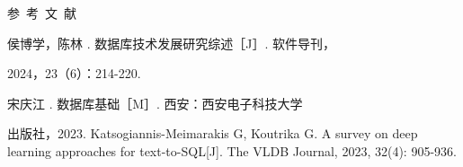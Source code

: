 \documentclass[10.5pt,compsoc,twocolumn]{CjC} %
\theoremstyle{mystyle}
\begin{document}
    
{
\begin{CJK*}{UTF8}{zhhei}参~考~文~献\end{CJK*}}
\begin{thebibliography}{99}
 \addtolength{\itemsep}{-1em}
\vspace {1.5mm}

\begin{CJK*}{UTF8}{song}侯博学，陈林 . 数据库技术发展研究综述［J］. 软件导刊，\end{CJK*}
2024，23（6）：214-220.
 \begin{CJK*}{UTF8}{song}宋庆江 . 数据库基础［M］. 西安：西安电子科技大学\end{CJK*}
出版社，2023.
 Katsogiannis-Meimarakis G, Koutrika G. A survey on deep learning approaches for text-to-SQL[J]. The VLDB Journal, 2023, 32(4): 905-936.


\end{thebibliography}
\end{document}
